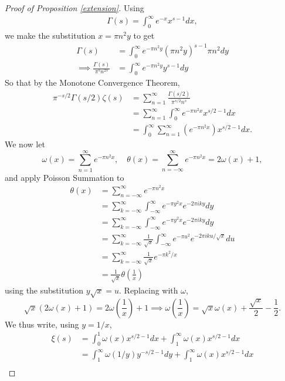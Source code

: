 \begin{proof}[Proof of Proposition \ref{extension}]
	Using \begin{align*}
		\Gamma(s)=\int_{0}^{\infty} e^{-x}x^{s-1}dx,
	\end{align*}
	we make the substitution $x=\pi n^2y$ to get \begin{align*}
		\Gamma(s)&= \int_{0}^{\infty} e^{-\pi n^2 y} (\pi n^2 y)^{s-1} \pi n^2 dy\\
		\implies \frac{\Gamma(s)}{\pi^s n^{2s}} &= \int_{0}^{\infty} e^{-\pi n^2 y} y^{s-1} dy
	\end{align*}
	So that by the Monotone Convergence Theorem,\begin{align*}
		\pi^{-s/2}\Gamma(s/2)\zeta(s) &= \sum_{n=1}^{\infty}\frac{\Gamma(s/2)}{\pi^{s/2} n^s}\\
		&= \sum_{n=1}^{\infty} \int_{0}^{\infty} e^{-\pi n^2x} x^{s/2-1} dx\\
		&=  \int_{0}^{\infty}\sum_{n=1}^{\infty}\left(e^{-\pi n^2 x}\right)  x^{s/2-1} dx.
	\end{align*}
	We now let \[
		\omega(x) = \sum_{n=1}^{\infty} e^{-\pi n^2 x}, \quad \theta(x) = \sum_{n=-\infty}^{\infty} e^{-\pi n^2 x} = 2\omega(x)+1,
	\]
	and apply Poisson Summation to \begin{align*}
		\theta(x) &= \sum_{n=-\infty}^{\infty} e^{-\pi n^2 x}\\
		&= \sum_{k=-\infty}^{\infty} \int_{-\infty}^{\infty} e^{-\pi y^2 x} e^{-2\pi i k y} dy\\
		&= \sum_{k=-\infty}^{\infty} \int_{-\infty}^{\infty} e^{-\pi y^2 x} e^{-2\pi i k y} dy\\
		&= \sum_{k=-\infty}^{\infty} \frac{1}{\sqrt{x}} \int_{-\infty}^{\infty} e^{-\pi u^2} e^{-2\pi i k u /\sqrt{x}} du\\
		&= \sum_{k=-\infty}^{\infty} \frac{1}{\sqrt{x}} e^{-\pi k^2  / x}\\
		&= \frac{1}{\sqrt{x}} \theta \left(\frac{1}{x}\right)
	\end{align*}
	using the substitution $y\sqrt{x}=u$. Replacing with $\omega$, \[
	\sqrt{x}(2\omega(x)+1) = 2\omega\left(\frac{1}{x}\right)+1
	\implies \omega\left(\frac{1}{x}\right)=\sqrt{x}\omega(x) +\frac{\sqrt{x}}{2} - \frac{1}{2}.
	\]
	We thus write, using $y=1/x$, \begin{align*}
		\xi(s) &= \int_{0}^{1}\omega(x) x^{s/2-1} dx +
		\int_{1}^{\infty}\omega(x)  x^{s/2-1} dx\\
		&=\int_{1}^{\infty}\omega(1/y) y^{-s/2-1} dy +
		\int_{1}^{\infty}\omega(x)  x^{s/2-1} dx\\

\end{align*}
\end{proof}
